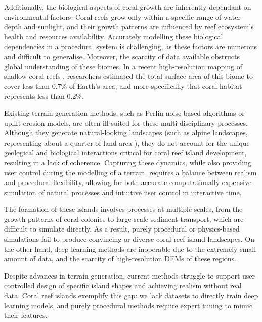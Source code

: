 Additionally, the biological aspects of coral growth are inherently dependant on environmental factors. Coral reefs grow only within a specific range of water depth and sunlight, and their growth patterns are influenced by reef ecosystem's health and resources availability. Accurately modelling these biological dependencies in a procedural system is challenging, as these factors are numerous and difficult to generalise. Moreover, the scarcity of data available obstructs global understanding of these biomes. In a recent high-resolution mapping of shallow coral reefs \cite{Lyons2024}, researchers estimated the total surface area of this biome to cover less than 0.7\% of Earth's area, and more specifically that coral habitat represents less than 0.2\%.

Existing terrain generation methods, such as Perlin noise-based algorithms or uplift-erosion models, are often ill-suited for these multi-disciplinary processes. Although they generate natural-looking landscapes (such as alpine landscapes, representing about a quarter of land area \cite{Korner2014}), they do not account for the unique geological and biological interactions critical for coral reef island development, resulting in a lack of coherence. Capturing these dynamics, while also providing user control during the modelling of a terrain, requires a balance between realism and procedural flexibility, allowing for both accurate computationally expensive simulation of natural processes and intuitive user control in interactive time.

The formation of these islands involves processes at multiple scales, from the growth patterns of coral colonies to large-scale sediment transport, which are difficult to simulate directly. As a result, purely procedural or physics-based simulations fail to produce convincing or diverse coral reef island landscapes. On the other hand, deep learning methods are inoperable due to the extremely small amount of data, and the scarcity of high-resolution DEMs of these regions.

Despite advances in terrain generation, current methods struggle to support user-controlled design of specific island shapes and achieving realism without real data. Coral reef islands exemplify this gap: we lack datasets to directly train deep learning models, and purely procedural methods require expert tuning to mimic their features.

